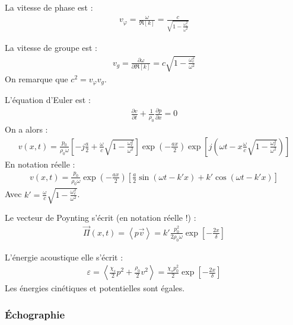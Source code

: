 \documentclass{report}
\begin{document}
\begin{itemize}
	La vitesse de phase est :
	\begin{align*}
		v_\varphi = \frac{\omega}{\Re\left[ k\right] }=\frac{c}{\sqrt{1-\frac{\omega_c^2}{\omega^2}}}
	\end{align*}
	
	La vitesse de groupe est :
	\begin{align*}
		v_g = \frac{\partial\omega}{\partial \Re\left[ k\right] }=c\sqrt{1-\frac{\omega_c^2}{\omega^2}}
	\end{align*}
	On remarque que $c^2=v_\varphi v_g$.
	
	L'équation d'Euler est :
	\begin{align*}
	\frac{\partial v}{\partial t}+\frac{1}{\rho_0}\frac{\partial p}{\partial x}=0
	\end{align*}
	On a alors :
	\begin{align*}
		v(x,t)=\frac{p_0}{\rho_0\omega}\left[-j\frac{a}{2} +\frac{\omega}{c}\sqrt{1-\frac{\omega_c^2}{\omega^2}}\right] \exp\left(-\frac{ax}{2} \right) \exp\left[ j\left(\omega t- x\frac{\omega}{c}\sqrt{1-\frac{\omega_c^2}{\omega^2}}\right) \right] 
	\end{align*}
	En notation réelle :
	\begin{align*}
		v(x,t)=\frac{p_0}{\rho_0\omega}\exp\left(-\frac{ax}{2} \right)\left[\frac{a}{2}\sin(\omega t-k'x) +k'\cos(\omega t- k'x)\right] 
	\end{align*}	
	Avec $k'=\frac{\omega}{c}\sqrt{1-\frac{\omega_c^2}{\omega^2}}$.
	
	Le vecteur de Poynting s'écrit (en notation réelle !) :
	\begin{align*}
		\vec{\Pi}(x,t)=\left\langle p\vec{v} \right\rangle =k'\frac{p_0^2}{2\rho_0\omega}\exp\left[-\frac{2x}{\delta} \right] 
	\end{align*}
	
	L'énergie acoustique elle s'écrit :
	\begin{align*}
		\varepsilon=\left\langle \frac{\chi_s}{2}p^2+\frac{\rho_0}{2}v^2\right\rangle = \frac{\chi_sp_0^2}{2}\exp\left[-\frac{2x}{\delta} \right] 
	\end{align*}
	Les énergies cinétiques et potentielles sont égales.

\end{itemize}

\subsubsection*{Échographie}
\end{document}
